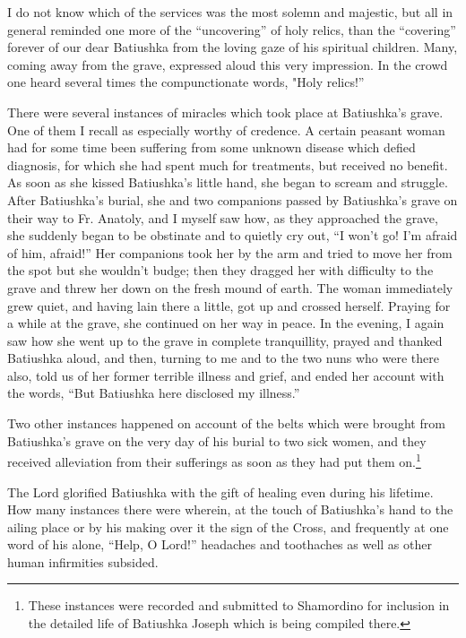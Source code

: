 I do not know which of the services was the most solemn and majestic, but all in general reminded one more of the “uncovering” of holy relics, than the “covering” forever of our dear Batiushka from the loving gaze of his spiritual children. Many, coming away from the grave, expressed aloud this very impression. In the crowd one heard several times the compunctionate words, "Holy relics!”

There were several instances of miracles which took place at Batiushka's grave. One of them I recall as especially worthy of credence. A certain peasant woman had for some time been suffering from some unknown disease which defied diagnosis, for which she had spent much for treatments, but received no benefit. As soon as she kissed Batiushka's little hand, she began to scream and struggle. After Batiushka's burial, she and two companions passed by Batiushka's grave on their way to Fr. Anatoly, and I myself saw how, as they approached the grave, she suddenly began to be obstinate and to quietly cry out, “I won't go! I'm afraid of him, afraid!” Her companions took her by the arm and tried to move her from the spot but she wouldn't budge; then they dragged her with difficulty to the grave and threw her down on the fresh mound of earth. The woman immediately grew quiet, and having lain there a little, got up and crossed herself. Praying for a while at the grave, she continued on her way in peace. In the evening, I again saw how she went up to the grave in complete tranquillity, prayed and thanked Batiushka aloud, and then, turning to me and to the two nuns who were there also, told us of her former terrible illness and grief, and ended her account with the words, “But Batiushka here disclosed my illness.”

Two other instances happened on account of the belts which were brought from Batiushka's grave on the very day of his burial to two sick women, and they received alleviation from their sufferings as soon as they had put them on.\footnote{These instances were recorded and submitted to Shamordino for inclusion in the detailed life of Batiushka Joseph which is being compiled there.}

The Lord glorified Batiushka with the gift of healing even during his lifetime. How many instances there were wherein, at the touch of Batiushka's hand to the ailing place or by his making over it the sign of the Cross, and frequently at one word of his alone, “Help, O Lord!” headaches and toothaches as well as other human infirmities subsided.

